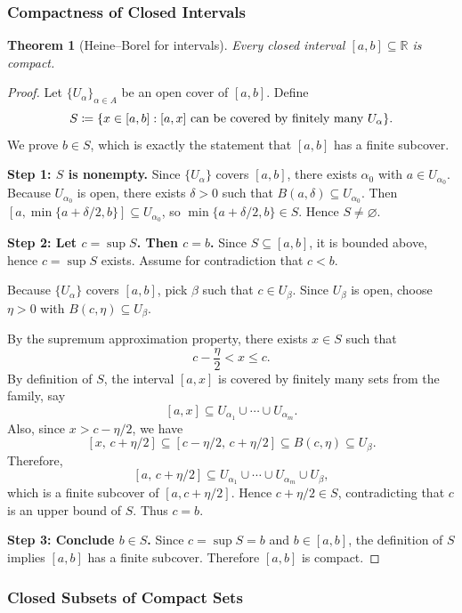 \documentclass[12pt]{article}
\numberwithin{equation}{section}
\newcommand{\RR}{\mathbb{R}}
\let\emptyset\varnothing
\DeclarePairedDelimiter{\set}{\{}{\}}
\theoremstyle{plain}
\newtheorem{theorem}{Theorem}[section]
\theoremstyle{definition}
\theoremstyle{remark}
\begin{document}
\subsubsection{Compactness of Closed Intervals}

\begin{theorem}[Heine--Borel for intervals]\label{thm:interval-compact}
Every closed interval $[a,b]\subseteq\RR$ is compact.
\end{theorem}

\begin{proof}
Let $\{U_\alpha\}_{\alpha\in A}$ be an open cover of $[a,b]$.
Define
\[
S \coloneqq \set{x\in[a,b] : [a,x]\ \text{can be covered by finitely many }U_\alpha }.
\]
We prove $b\in S$, which is exactly the statement that $[a,b]$ has a finite subcover.

\medskip
\noindent\textbf{Step 1: $S$ is nonempty.}
Since $\{U_\alpha\}$ covers $[a,b]$, there exists $\alpha_0$ with $a\in U_{\alpha_0}$.
Because $U_{\alpha_0}$ is open, there exists $\delta>0$ such that $B(a,\delta)\subseteq U_{\alpha_0}$.
Then $[a,\min\{a+\delta/2,b\}]\subseteq U_{\alpha_0}$, so $\min\{a+\delta/2,b\}\in S$.
Hence $S\neq\emptyset$.

\medskip
\noindent\textbf{Step 2: Let $c=\sup S$. Then $c=b$.}
Since $S\subseteq[a,b]$, it is bounded above, hence $c=\sup S$ exists.
Assume for contradiction that $c<b$.

Because $\{U_\alpha\}$ covers $[a,b]$, pick $\beta$ such that $c\in U_\beta$.
Since $U_\beta$ is open, choose $\eta>0$ with $B(c,\eta)\subseteq U_\beta$.

By the supremum approximation property, there exists $x\in S$ such that
\[
c-\frac{\eta}{2} < x \le c.
\]
By definition of $S$, the interval $[a,x]$ is covered by finitely many sets from the family, say
\[
[a,x] \subseteq U_{\alpha_1}\cup\cdots\cup U_{\alpha_m}.
\]
Also, since $x>c-\eta/2$, we have
\[
[x,\,c+\eta/2] \subseteq [c-\eta/2,\,c+\eta/2]\subseteq B(c,\eta)\subseteq U_\beta.
\]
Therefore,
\[
[a,\,c+\eta/2] \subseteq U_{\alpha_1}\cup\cdots\cup U_{\alpha_m}\cup U_\beta,
\]
which is a finite subcover of $[a,c+\eta/2]$.
Hence $c+\eta/2\in S$, contradicting that $c$ is an upper bound of $S$.
Thus $c=b$.

\medskip
\noindent\textbf{Step 3: Conclude $b\in S$.}
Since $c=\sup S=b$ and $b\in[a,b]$, the definition of $S$ implies $[a,b]$ has a finite subcover.
Therefore $[a,b]$ is compact.
\end{proof}

\subsubsection{Closed Subsets of Compact Sets}
\end{document}
